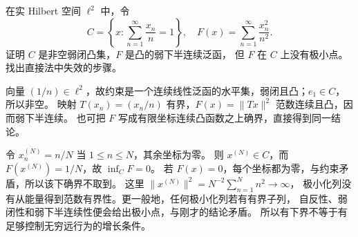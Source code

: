 \begin{exercise}\label{b1:ex:09-noncoercive-quadratic}
在实 Hilbert 空间 \(\ell^2\) 中，令
\[
 C=\left\{x:\sum_{n=1}^{\infty}\frac{x_n}{n}=1\right\},
 \quad F(x)=\sum_{n=1}^{\infty}\frac{x_n^2}{n^2}.
\]
证明 \(C\) 是非空弱闭凸集，\(F\) 是凸的弱下半连续泛函，
但 \(F\) 在 \(C\) 上没有极小点。找出直接法中失效的步骤。
\end{exercise}
\begin{solution}
向量 \((1/n)\in\ell^2\)，故约束是一个连续线性泛函的水平集，弱闭且凸；\(e_1\in C\)，所以非空。
映射 \(T(x_n)=(x_n/n)\) 有界，\(F(x)=\|Tx\|^2\) 范数连续且凸，因而弱下半连续。
也可把 \(F\) 写成有限坐标连续凸函数之上确界，直接得到同一结论。

令 \(x_n^{(N)}=n/N\) 当 \(1\leq n\leq N\)，其余坐标为零。
则 \(x^{(N)}\in C\)，而 \(F(x^{(N)})=1/N\)，故 \(\inf_CF=0\)。
若 \(F(x)=0\)，每个坐标都为零，与约束矛盾，所以该下确界不取到。
这里 \(\|x^{(N)}\|^2=N^{-2}\sum_{n=1}^N n^2\to\infty\)，
极小化列没有从能量得到范数有界性。更一般地，任何极小化列若有有界子列，
自反性、弱闭性和弱下半连续性便会给出极小点，与刚才的结论矛盾。
所以有下界不等于有足够控制无穷远行为的增长条件。
\end{solution}
